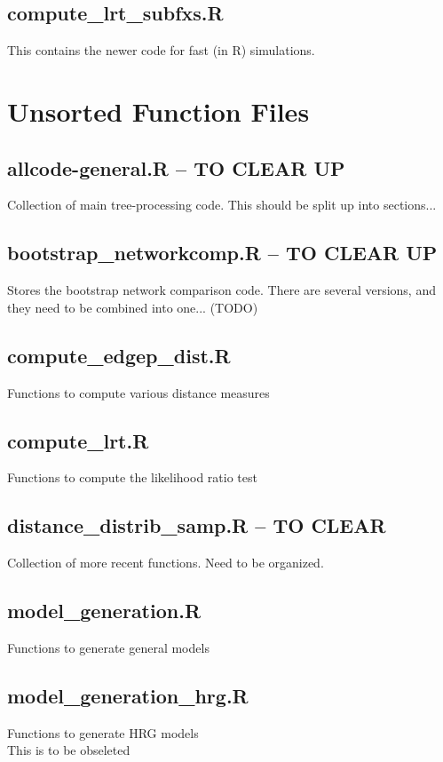\documentclass[11pt]{article}
\begin{document}
\subsection{compute\_lrt\_subfxs.R}
This contains the newer code for fast (in R) simulations. 

\section{Unsorted Function Files}

\subsection{allcode-general.R -- TO CLEAR UP}
Collection of main tree-processing code. This should be split up into sections...

\subsection{bootstrap\_networkcomp.R -- TO CLEAR UP}
Stores the bootstrap network comparison code. There are several versions, and they need to be combined into one... (TODO)

\subsection{compute\_edgep\_dist.R}
Functions to compute various distance measures

\subsection{compute\_lrt.R}
Functions to compute the likelihood ratio test



\subsection{distance\_distrib\_samp.R -- TO CLEAR}
Collection of more recent functions. Need to be organized. 


\subsection{model\_generation.R}
Functions to generate general models

\subsection{model\_generation\_hrg.R}
Functions to generate HRG models \\
This is to be obseleted
\end{document}
